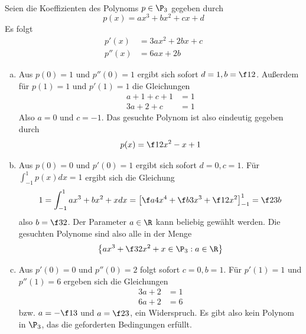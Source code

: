 \documentclass{mywork}
\begin{document}
\begin{aufgabe}~

	Seien die Koeffizienten des Polynoms $p\in \P_3$ gegeben durch
	\[
		p(x) = ax^3 + bx^2 + cx + d
	\]
	Es folgt
	\begin{align*}
		p'(x) &= 3ax^2 + 2bx + c \\
		p''(x) &= 6ax + 2b
	\end{align*}
	\begin{enumerate}[a)]
		\item
			Aus $p(0)=1$ und $p''(0)=1$ ergibt sich sofort $d=1, b=\f 12$.
			Außerdem für $p(1)=1$ und $p'(1)=1$ die Gleichungen
			\begin{align*}
				a + 1 + c + 1 &= 1\\
				3a + 2 + c &= 1
			\end{align*}
			Also $a=0$ und $c=-1$.
			Das gesuchte Polynom ist also eindeutig gegeben durch
			\[
				p(x) = \f 12 x^2 -x +1
			\]
		\item
			Aus $p(0)=0$ und $p'(0)=1$ ergibt sich sofort $d=0, c=1$.
			Für $\int_{-1}^1 p(x) dx = 1$ ergibt sich die Gleichung
			\[
				1 = \int_{-1}^1 ax^3 + bx^2 + x dx = \left[ \f a4 x^4 + \f b3 x^3 + \f 12 x^2\right]_{-1}^1
				= \f 23 b
			\]
			also $b=\f 32$.
			Der Parameter $a\in \R$ kann beliebig gewählt werden.
			Die gesuchten Polynome sind also alle in der Menge
			\[
				\left\{ax^3+\f 32 x^2 + x \in \P_3 : a\in \R \right\}
			\]
		\item
			Aus $p'(0)=0$ und $p''(0)=2$ folgt sofort $c=0, b=1$.
			Für $p'(1)=1$ und $p''(1)=6$ ergeben sich die Gleichungen
			\begin{align*}
				3a + 2 &= 1 \\
				6a + 2 &= 6
			\end{align*}
			bzw. $a=-\f 13$ und $a=\f 23$, ein Widerspruch.
			Es gibt also kein Polynom in $\P_3$, das die geforderten Bedingungen erfüllt.
	\end{enumerate}		
\end{aufgabe}
\end{document}

